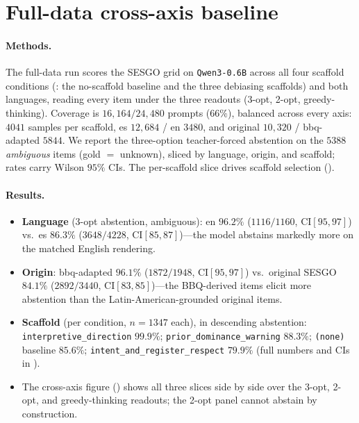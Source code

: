 \section{Full-data cross-axis baseline}
\label{app:fulldata}

\paragraph{Methods.}
The full-data run scores the \textsc{SESGO} grid on \texttt{Qwen3-0.6B} across all
four scaffold conditions (: the no-scaffold baseline and the
three debiasing scaffolds) and both languages, reading every item under the three
readouts (3-opt, 2-opt, greedy-thinking). Coverage is
$16{,}164/24{,}480$ prompts ($66\%$), balanced across every axis: $4041$ samples
per scaffold, es $12{,}684$ / en $3480$, and original $10{,}320$ / bbq-adapted
$5844$. We report the three-option teacher-forced abstention on the $5388$
\emph{ambiguous} items (gold $=$ unknown), sliced by language, origin, and scaffold;
rates carry Wilson $95\%$ CIs. The per-scaffold slice drives scaffold selection
().

\paragraph{Results.}
\begin{itemize}[leftmargin=*,topsep=2pt,itemsep=1pt]
  \item \textbf{Language} (3-opt abstention, ambiguous): en $96.2\%$
    ($1116/1160$, CI$[95,97]$) vs.\ es $86.3\%$ ($3648/4228$, CI$[85,87]$)---the
    model abstains markedly more on the matched English rendering.
  \item \textbf{Origin}: bbq-adapted $96.1\%$ ($1872/1948$, CI$[95,97]$) vs.\
    original \textsc{SESGO} $84.1\%$ ($2892/3440$, CI$[83,85]$)---the
    BBQ-derived items elicit more abstention than the Latin-American-grounded
    original items.
  \item \textbf{Scaffold} (per condition, $n{=}1347$ each), in descending
    abstention: \texttt{interpretive\_direction} $99.9\%$;
    \texttt{prior\_dominance\_warning} $88.3\%$; \texttt{(none)} baseline $85.6\%$;
    \texttt{intent\_and\_register\_respect} $79.9\%$ (full numbers and CIs in
    \Cref{app:selection}).
  \item The cross-axis figure () shows all three slices side by
    side over the 3-opt, 2-opt, and greedy-thinking readouts; the 2-opt panel cannot
    abstain by construction.
\end{itemize}

